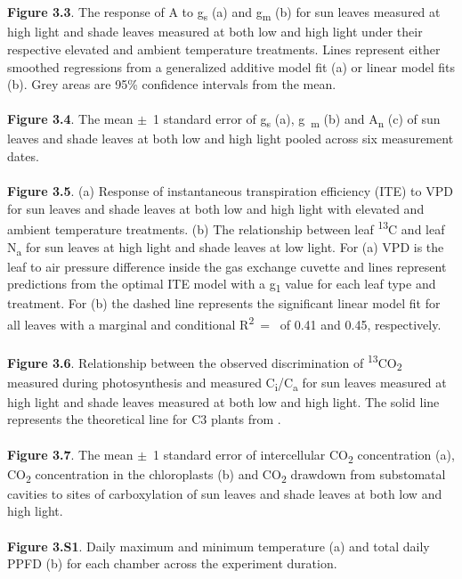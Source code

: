 \documentclass[a4paper]{article}\usepackage[]{graphicx}\usepackage[]{color}
\begin{document}
\\
\\
\textbf{Figure 3.3}. The response of A to g\textsubscript{s} (a) and g\textsubscript{m} (b) for sun leaves measured at high light and shade leaves measured at both low and high light under their respective elevated and ambient temperature treatments. Lines represent either smoothed regressions from a generalized additive model fit (a) or linear model fits (b). Grey areas are 95\% confidence intervals from the mean.
\\
\\
\textbf{Figure 3.4}. The mean $\pm$~1 standard error of g\textsubscript{s} (a), g~\textsubscript{m} (b) and A\textsubscript{n} (c) of sun leaves and shade leaves at both low and high light pooled across six measurement dates.
\\
\\
\textbf{Figure 3.5}. (a) Response of instantaneous transpiration efficiency (ITE) to VPD for sun leaves and shade leaves at both low and high light with elevated and ambient temperature treatments. (b) The relationship between leaf {\textdelta}\textsuperscript{13}C and leaf N\textsubscript{a} for sun leaves at high light and shade leaves at low light. For (a) VPD is the leaf to air pressure difference inside the gas exchange cuvette and lines represent predictions from the optimal ITE model with a g\textsubscript{1} value for each leaf type and treatment. For (b) the dashed line represents the significant linear model fit for all leaves with a marginal and conditional R\textsuperscript{2}~=~ of 0.41 and 0.45, respectively.
\\
\\
\textbf{Figure 3.6}. Relationship between the observed discrimination of \textsuperscript{13}CO\textsubscript{2} measured during photosynthesis and measured C\textsubscript{i}/C\textsubscript{a} for sun leaves measured at high light and shade leaves measured at both low and high light. The solid line represents the theoretical line for C3 plants from \citet{evans1986carbon}.
\\
\\
\textbf{Figure 3.7}. The mean $\pm$~1 standard error of intercellular CO\textsubscript{2} concentration (a), CO\textsubscript{2} concentration in the chloroplasts (b) and CO\textsubscript{2} drawdown from substomatal cavities to sites of carboxylation of sun leaves and shade leaves at both low and high light.
\\
\\
\textbf{Figure 3.S1}. Daily maximum and minimum temperature (a) and total daily PPFD (b) for each chamber across the experiment duration.
\end{document}
